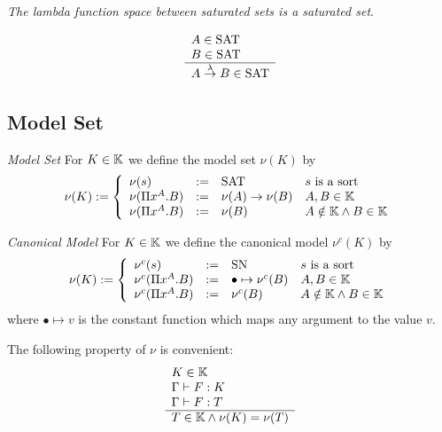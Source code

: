 \begin{theorem}
    \label{LambdaSpaceSaturated}
    \emph{The lambda function space between saturated sets is a saturated set}.

    $$
    \begin{array}{l} 
        A \in \text{SAT}
        \\
        B \in \text{SAT}
     \\ \hline 
        A \stackrel{\lambda}{\to} B \in \text{SAT}
    \end{array}
    $$
\end{theorem}




\subsection{Model Set}

\begin{definition}
    \emph{Model Set} For $K \in \mathbb{K}$ we define the model set
    $\nu(K)$ by
    $$
        \nu(K) :=
        \left \{
        \begin{array}{llll}
            \nu(s) &:=& \text{SAT} & s \text{ is a sort}
            \\
            \nu(\Pi x^A. B) &:=& \nu(A)\to \nu(B) & A,B \in \mathbb{K}
            \\
            \nu(\Pi x^A. B) &:=& \nu(B) & A \notin \mathbb{K} \land B \in \mathbb{K}
        \end{array}
        \right.
    $$
\end{definition}



\begin{definition}
    \emph{Canonical Model} For $K \in \mathbb{K}$ we define the
    canonical model $\nu^c(K)$ by
    $$
        \nu(K) :=
        \left \{
        \begin{array}{llll}
            \nu^c(s) &:=& \text{SN} & s \text{ is a sort}
            \\
            \nu^c(\Pi x^A. B)
            &:=&
            \bullet \mapsto \nu^c(B) & A,B \in \mathbb{K}
            \\
            \nu^c(\Pi x^A. B)
            &:=&
            \nu^c(B) & A \notin \mathbb{K} \land B \in \mathbb{K}
        \end{array}
        \right.
    $$
    where $\bullet \mapsto v$ is the constant function which maps any argument
    to the value $v$.
\end{definition}


The following property of $\nu$ is convenient:
$$
    \begin{array}{l} 
        K \in \mathbb{K}
        \\
        \Gamma \vdash F: K
        \\
        \Gamma \vdash F: T
     \\ \hline 
        T \in \mathbb{K} \land \nu(K) = \nu(T)
    \end{array}
$$


